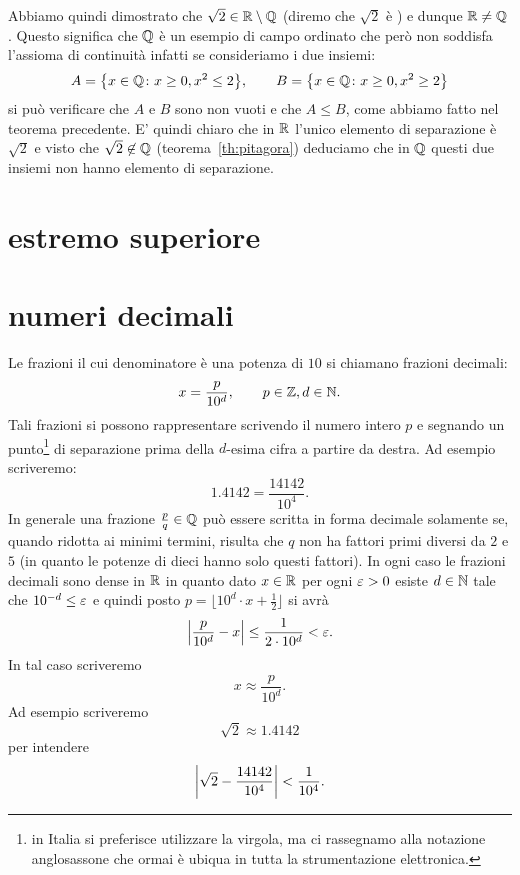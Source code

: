 Abbiamo quindi dimostrato che $\sqrt{2} \in \mathbb R \setminus \mathbb Q$
(diremo che $\sqrt 2$ è
%
%
) e dunque $\mathbb R \neq \mathbb Q$.
Questo significa che $\mathbb Q$ è un esempio di campo ordinato che però
non soddisfa l'assioma di continuità infatti se consideriamo i due insiemi:
\[
 A = {\left\{ x\in \mathbb Q \colon x\ge 0, x^2 \le 2 \right\}},\qquad
 B = {\left\{ x\in \mathbb Q \colon x\ge 0, x^2 \ge 2 \right\}}
\]
si può verificare che $A$ e $B$ sono non vuoti e che $A \le B$,
come abbiamo fatto nel teorema precedente.
E' quindi chiaro che in $\mathbb R$ l'unico elemento di separazione
è $\sqrt 2$ e visto che $\sqrt 2\not \in \mathbb Q$ (teorema~\ref{th:pitagora})
deduciamo che in $\mathbb Q$ questi due insiemi non hanno elemento di separazione.

\section{estremo superiore}


\section{numeri decimali}
%
Le frazioni il cui denominatore è una potenza
di $10$ si chiamano frazioni decimali:
\[
  x = \frac{p}{10^d}, \qquad p\in \mathbb Z, d\in \mathbb N.
\]
Tali frazioni si possono rappresentare
scrivendo il numero
intero $p$ e segnando un punto\footnote{%
in Italia si preferisce utilizzare la virgola, ma
ci rassegnamo alla notazione anglosassone che ormai è
ubiqua in tutta la strumentazione elettronica.
}
di separazione
prima della $d$-esima cifra a partire da destra.
Ad esempio scriveremo:
\[
  1.4142 = \frac{14142}{10^4}.
\]
In generale una frazione $\frac{p}{q}\in \mathbb Q$
può essere scritta in forma decimale solamente
se, quando ridotta ai minimi termini,
risulta che $q$ non ha fattori primi diversi
da $2$ e $5$ (in quanto le potenze di dieci
hanno solo questi fattori).
In ogni caso le frazioni decimali sono dense in $\mathbb R$
in quanto dato $x\in \mathbb R$ per ogni $\varepsilon>0$ esiste
$d\in \mathbb N$ tale che $10^{-d}\le\varepsilon$ e quindi
posto $p=\lfloor 10^d\cdot x + \frac 1 2\rfloor$
si avrà
\[
    {\left|\frac{p}{10^d} - x\right|} \le \frac{1}{2\cdot 10^d} < \varepsilon.
\]
In tal caso scriveremo
\mymargin{$\approx$}
\[
  x \approx \frac{p}{10^d}.
\]
Ad esempio scriveremo
\[
  \sqrt 2 \approx 1.4142
\]
per intendere
\begin{equation}\label{eq:approx_rad2}
{\left|\sqrt 2 - \frac{14142}{10^4}\right|}<\frac{1}{10^4}.
\end{equation}

